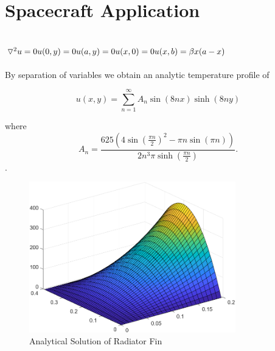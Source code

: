 \documentclass{article}
\begin{document}
\section{Spacecraft Application}
\subsection*{$
\triangledown^{2}u =0\\
u(0,y)  =0\\
u(a,y)  =0\\
u(x,0)  =0\\
u(x,b)  =\beta x(a-x)$}


By separation of variables we obtain an analytic temperature profile of 

\[
u(x,y)=\sum_{n=1}^{\infty}A_{n}\sin(8nx)\sinh(8ny)
\]

where  
\[
A_{n}=\frac{625\left(4\sin\left(\frac{\pi n}{2}\right)^{2}-\pi n\sin\left(\pi n\right)\right)}{2n^{3}\pi\sinh\left(\frac{\pi n}{2}\right)}.
\].
\begin{figure}[H]
    \centering
    \includegraphics[width=0.8\textwidth]{AnalyticalSolution.png}
    \caption{Analytical Solution of Radiator Fin}
\end{figure}
\end{document}
